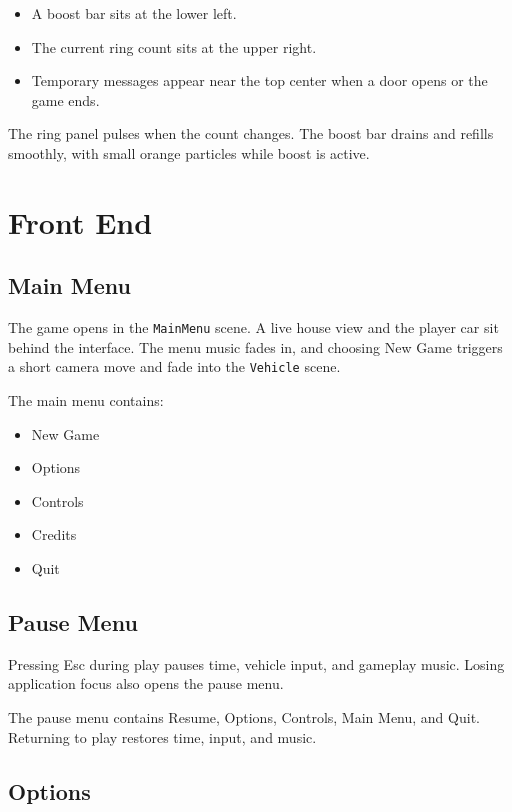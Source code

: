 \documentclass[11pt,a4paper]{article}
\begin{document}
\begin{itemize}
\item
  A boost bar sits at the lower left.
\item
  The current ring count sits at the upper right.
\item
  Temporary messages appear near the top center when a door opens or the game ends.
\end{itemize}

The ring panel pulses when the count changes. The boost bar drains and refills smoothly, with small orange particles while boost is active.

\section{Front End}\label{front-end}

\subsection{Main Menu}\label{main-menu}

The game opens in the \texttt{MainMenu} scene. A live house view and the player car sit behind the interface. The menu music fades in, and choosing New Game triggers a short camera move and fade into the \texttt{Vehicle} scene.

The main menu contains:

\begin{itemize}
\item
  New Game
\item
  Options
\item
  Controls
\item
  Credits
\item
  Quit
\end{itemize}

\subsection{Pause Menu}\label{pause-menu}

Pressing Esc during play pauses time, vehicle input, and gameplay music. Losing application focus also opens the pause menu.

The pause menu contains Resume, Options, Controls, Main Menu, and Quit. Returning to play restores time, input, and music.

\subsection{Options}\label{options}
\end{document}
